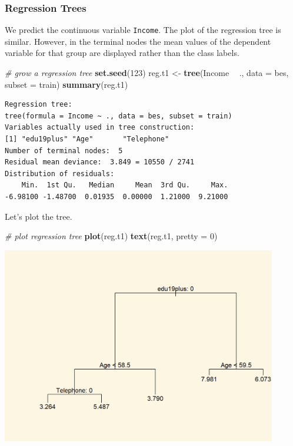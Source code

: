 \documentclass[]{article}
\newenvironment{Shaded}{\begin{snugshade}}{\end{snugshade}}
\newcommand{\CommentTok}[1]{\textcolor[rgb]{0.56,0.35,0.01}{\textit{#1}}}
\newcommand{\DataTypeTok}[1]{\textcolor[rgb]{0.13,0.29,0.53}{#1}}
\newcommand{\DecValTok}[1]{\textcolor[rgb]{0.00,0.00,0.81}{#1}}
\newcommand{\KeywordTok}[1]{\textcolor[rgb]{0.13,0.29,0.53}{\textbf{#1}}}
\newcommand{\NormalTok}[1]{#1}
\newcommand{\OperatorTok}[1]{\textcolor[rgb]{0.81,0.36,0.00}{\textbf{#1}}}
\newcommand{\StringTok}[1]{\textcolor[rgb]{0.31,0.60,0.02}{#1}}
\begin{document}
\hypertarget{regression-trees}{%
\subsubsection{Regression Trees}\label{regression-trees}}

We predict the continuous variable \texttt{Income}. The plot of the regression tree is similar. However, in the terminal nodes the mean values of the dependent variable for that group are displayed rather than the class labels.

\begin{Shaded}
\begin{Highlighting}[]
\CommentTok{# grow a regression tree}
\KeywordTok{set.seed}\NormalTok{(}\DecValTok{123}\NormalTok{)}
\NormalTok{reg.t1 <-}\StringTok{ }\KeywordTok{tree}\NormalTok{(Income }\OperatorTok{~}\StringTok{ }\NormalTok{., }\DataTypeTok{data =}\NormalTok{ bes, }\DataTypeTok{subset =}\NormalTok{ train)}
\KeywordTok{summary}\NormalTok{(reg.t1)}
\end{Highlighting}
\end{Shaded}

\begin{verbatim}
Regression tree:
tree(formula = Income ~ ., data = bes, subset = train)
Variables actually used in tree construction:
[1] "edu19plus" "Age"       "Telephone"
Number of terminal nodes:  5 
Residual mean deviance:  3.849 = 10550 / 2741 
Distribution of residuals:
    Min.  1st Qu.   Median     Mean  3rd Qu.     Max. 
-6.98100 -1.48700  0.01935  0.00000  1.21000  9.21000 
\end{verbatim}

Let's plot the tree.

\begin{Shaded}
\begin{Highlighting}[]
\CommentTok{# plot regression tree}
\KeywordTok{plot}\NormalTok{(reg.t1)}
\KeywordTok{text}\NormalTok{(reg.t1, }\DataTypeTok{pretty =} \DecValTok{0}\NormalTok{)}
\end{Highlighting}
\end{Shaded}

\includegraphics[width=0.9\textwidth,height=\textheight]{./img/unnamed-chunk-150-1.png}
\end{document}
